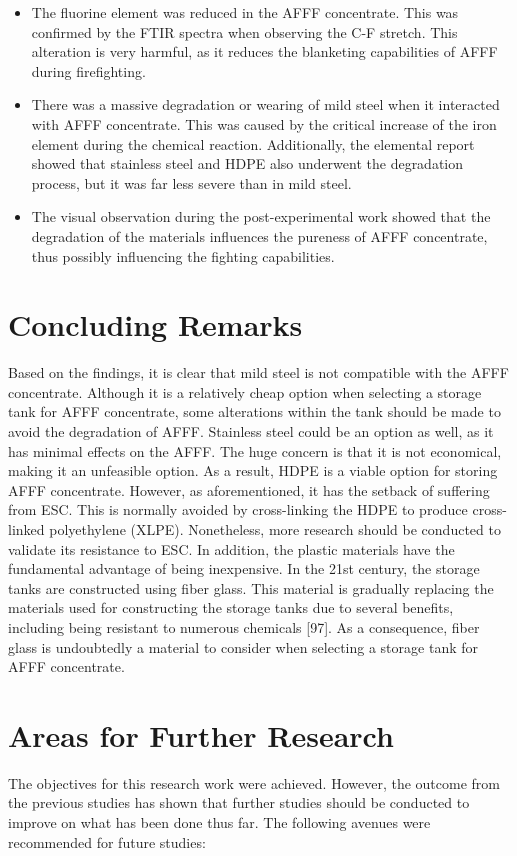 \documentclass[12pt]{report}
\begin{document}
\begin{itemize}
    \item The fluorine element was reduced in the AFFF concentrate. This was confirmed by the FTIR spectra when observing the C-F stretch. This alteration is very harmful, as it reduces the blanketing capabilities of AFFF during firefighting.
    \item There was a massive degradation or wearing of mild steel when it interacted with AFFF concentrate. This was caused by the critical increase of the iron element during the chemical reaction. Additionally, the elemental report showed that stainless steel and HDPE also underwent the degradation process, but it was far less severe than in mild steel.
    \item The visual observation during the post-experimental work showed that the degradation of the materials influences the pureness of AFFF concentrate, thus possibly influencing the fighting capabilities.
\end{itemize}

\section{Concluding Remarks}
Based on the findings, it is clear that mild steel is not compatible with the AFFF concentrate. Although it is a relatively cheap option when selecting a storage tank for AFFF concentrate, some alterations within the tank should be made to avoid the degradation of AFFF. Stainless steel could be an option as well, as it has minimal effects on the AFFF. The huge concern is that it is not economical, making it an unfeasible option. As a result, HDPE is a viable option for storing AFFF concentrate. However, as aforementioned, it has the setback of suffering from ESC. This is normally avoided by cross-linking the HDPE to produce cross-linked polyethylene (XLPE). Nonetheless, more research should be conducted to validate its resistance to ESC. In addition, the plastic materials have the fundamental advantage of being inexpensive.
In the 21st century, the storage tanks are constructed using fiber glass. This material is gradually replacing the materials used for constructing the storage tanks due to several benefits, including being resistant to numerous chemicals [97]. As a consequence, fiber glass is undoubtedly a material to consider when selecting a storage tank for AFFF concentrate.

\section{Areas for Further Research}
The objectives for this research work were achieved. However, the outcome from the previous studies has shown that further studies should be conducted to improve on what has been done thus far. The following avenues were recommended for future studies: 
\end{document}
